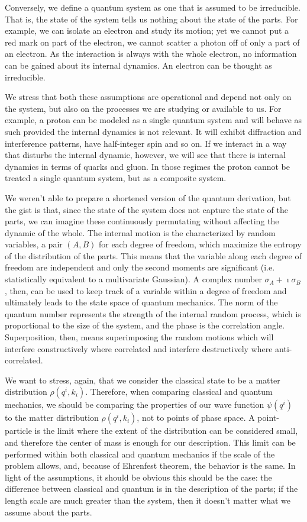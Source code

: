 \documentclass{ws-ijqi}
\begin{document}
Conversely, we define a quantum system as one that is assumed to be irreducible. That is, the state of the system tells us nothing about the state of the parts. For example, we can isolate an electron and study its motion; yet we cannot put a red mark on part of the electron, we cannot scatter a photon off of only a part of an electron. As the interaction is always with the whole electron, no information can be gained about its internal dynamics. An electron can be thought as irreducible.

We stress that both these assumptions are operational and depend not only on the system, but also on the processes we are studying or available to us. For example, a proton can be modeled as a single quantum system and will behave as such provided the internal dynamics is not relevant. It will exhibit diffraction and interference patterns, have half-integer spin and so on. If we interact in a way that disturbs the internal dynamic, however, we will see that there is internal dynamics in terms of quarks and gluon. In those regimes the proton cannot be treated a single quantum system, but as a composite system.

We weren't able to prepare a shortened version of the quantum derivation, but the gist is that, since the state of the system does not capture the state of the parts, we can imagine these continuously permutating without affecting the dynamic of the whole. The internal motion is the characterized by random variables, a pair $(A,B)$ for each degree of freedom, which maximize the entropy of the distribution of the parts. This means that the variable along each degree of freedom are independent and only the second moments are significant (i.e. statistically equivalent to a multivariate Gaussian). A complex number $\sigma_A + \imath \sigma_B$, then, can be used to keep track of a variable within a degree of freedom and ultimately leads to the state space of quantum mechanics. The norm of the quantum number represents the strength of the internal random process, which is proportional to the size of the system, and the phase is the correlation angle. Superposition, then, means superimposing the random motions which will interfere constructively where correlated and interfere destructively where anti-correlated.

We want to stress, again, that we consider the classical state to be a matter distribution $\rho(q^i, k_i)$. Therefore, when comparing classical and quantum mechanics, we should be comparing the properties of our wave function $\psi(q^i)$ to the matter distribution $\rho(q^i, k_i)$, not to points of phase space. A point-particle is the limit where the extent of the distribution can be considered small, and therefore the center of mass is enough for our description. This limit can be performed within both classical and quantum mechanics if the scale of the problem allows, and, because of Ehrenfest theorem, the behavior is the same. In light of the assumptions, it should be obvious this should be the case: the difference between classical and quantum is in the description of the parts; if the length scale are much greater than the system, then it doesn't matter what we assume about the parts.
\end{document}
